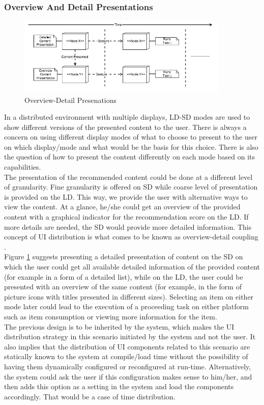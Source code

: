 \subsubsection{Overview And Detail Presentations}
\begin{figure}[!htpb]
\includegraphics[width=0.9\textwidth, center, center]{figures/generic3}
\caption{Overview-Detail Presenations}
\label{fig:figure33}
\end{figure}
In a distributed environment with multiple displays, LD-SD modes are used to show different versions of the presented content to the user. There is always a concern on using different display modes of what to choose to present to the user on which display/mode and what would be the basis for this choice. There is also the question of how to present the content differently on each mode based on its capabilities.\\
The presentation of the recommended content could be done at a different level
of granularity. Fine granularity is offered on SD while coarse level of
presentation is provided on the LD. This way, we provide the user with
alternative ways to view the content. At a glance, he/she could get an overview
of the provided content with a graphical indicator for the recommendation score
on the LD. If more details are needed, the SD would provide more  detailed
information. This concept of UI distribution is what comes to be known as
overview-detail coupling \cite{kaviani2011dual}.\\
Figure \ref{fig:figure33} suggests presenting a detailed presentation  of content on the SD on which the user could get all available detailed information of the provided content (for example in a form of a detailed list), while on the LD, the user could be presented with an overview of the same content (for example, in the form of picture icons with titles presented in different sizes). Selecting an item on either mode later could lead to the execution of a proceeding task on either platform such as item consumption or viewing more information for the item.\\      
The previous design is to be inherited by the system, which makes the UI distribution strategy in this scenario initiated by the system and not the user. It also implies that the distribution of UI components related to this scenario are statically known to the system at compile/load time without the possibility of having them dynamically configured or reconfigured at run-time. Alternatively, the system could ask the user if this configuration makes sense to him/her, and then adds this option as a setting in the system and load the components accordingly. That would be a case of time distribution. 
